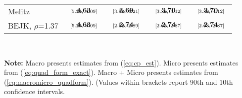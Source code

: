 \documentclass[12pt,dvips, ps2pdf]{article}
\begin{document}
\begin{table}[!t]
\begin{center}
\begin{tabular}[t]{l c c c c}
Melitz            & $\begin{array}{c}{\textbf{4.63}} \vspace{-.4cm}\\ \scriptstyle{[5.21,   \ 4.09]}\end{array}$    &  $\begin{array}{c}{\textbf{3.69}} \vspace{-.4cm}\\ \scriptstyle{[3.32,   \ 4.21]}\end{array}$ & $\begin{array}{c}{\textbf{3.70}} \vspace{-.4cm}\\ \scriptstyle{[3.32,   \ 4.12]}\end{array}$  & $\begin{array}{c}{\textbf{3.70}} \vspace{-.4cm}\\ \scriptstyle{[3.32,   \ 4.12]}\end{array}$         \\
BEJK, $\rho$=1.37            & $\begin{array}{c}{\textbf{4.63}} \vspace{-.4cm}\\ \scriptstyle{[5.21,   \ 4.09]}\end{array}$    &  $\begin{array}{c}{\textbf{2.74}} \vspace{-.4cm}\\ \scriptstyle{[2.62,   \ 2.89]}\end{array}$  & $\begin{array}{c}{\textbf{2.74}} \vspace{-.4cm}\\ \scriptstyle{[2.62,   \ 2.87]}\end{array}$           & $\begin{array}{c}{\textbf{2.74}} \vspace{-.4cm}\\ \scriptstyle{[2.63,   \ 2.87]}\end{array}$ \\
\hline
\end{tabular}
\\[0.75ex]
\parbox{5.1in}{\footnotesize \textbf{Note:} Macro presents estimates from (\ref{eq:cp_est}). Micro presents estimates from (\ref{eq:quad_form_exact}). Macro + Micro presents estimates from (\ref{eq:macromicro_quadform}). (Values within brackets report 90th and 10th confidence intervals. }
\end{center}
\end{table}
\end{document}

